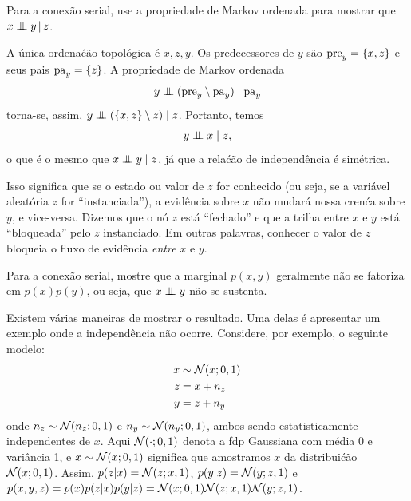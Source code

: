 \begin{exenumerate}
    \item Para a conex\~ao serial, use a propriedade de Markov ordenada para mostrar que 
    $x \mathrel{\perp\mspace{-10mu}\perp} y \,|\, z$.
    \begin{solution}
        A \'unica ordena\'c\~ao topol\'ogica \'e $x, z, y$. Os predecessores de
        $y$ s\~ao $\mathrm{pre}_y = \{x, z\}$ e seus pais $\mathrm{pa}_y = \{z\}$. A
        propriedade de Markov ordenada
        \begin{equation}
            y \mathrel{\perp\mspace{-10mu}\perp} ( \mathrm{pre}_y \setminus \mathrm{pa}_y ) \mid \mathrm{pa}_y
        \end{equation}
        torna-se, assim, $y \mathrel{\perp\mspace{-10mu}\perp} (\{x, z\} \setminus z) \mid z$. Portanto, temos
        \begin{equation}
            y \mathrel{\perp\mspace{-10mu}\perp} x \mid z,
        \end{equation}
        o que \'e o mesmo que $x \mathrel{\perp\mspace{-10mu}\perp} y \mid z$, j\'a que a
        rela\'c\~ao de independ\^encia \'e sim\'etrica.
        
        Isso significa que se o estado ou valor de $z$ for conhecido (ou seja, se
        a vari\'avel aleat\'oria $z$ for ``instanciada''), a evid\^encia sobre $x$
        n\~ao mudar\'a nossa cren\'ca sobre $y$, e vice-versa. Dizemos que
        o n\'o $z$ est\'a ``fechado'' e que a trilha entre $x$ e $y$
        est\'a ``bloqueada'' pelo $z$ instanciado. Em outras palavras, conhecer
        o valor de $z$ bloqueia o fluxo de evid\^encia \emph{entre} $x$
        e $y$.
        
    \end{solution}
    \item Para a conex\~ao serial, mostre que a marginal $p(x,y)$ geralmente n\~ao se fatoriza em $p(x)p(y)$, ou seja, que $x \mathrel{\perp\mspace{-10mu}\perp} y$ n\~ao se sustenta.
    \begin{solution}
        Existem v\'arias maneiras de mostrar o resultado. Uma delas \'e
        apresentar um exemplo onde a independ\^encia n\~ao
        ocorre. Considere, por exemplo, o seguinte modelo:
        \begin{align}
            x & \sim \mathcal{N}(x; 0, 1)\label{eq:serial-x}\\
            z &= x + n_z\\
            y &= z + n_y \label{eq:serial-y}
        \end{align}
        onde $n_z \sim \mathcal{N}(n_z; 0, 1)$ e $n_y \sim \mathcal{N}(n_y;
        0, 1)$, ambos sendo estatisticamente independentes de $x$. Aqui
        $\mathcal{N}(\cdot; 0, 1)$ denota a fdp Gaussiana com m\'edia 0 e
        vari\^ancia 1, e $x \sim \mathcal{N}(x; 0, 1)$ significa que amostramos
        $x$ da distribui\'c\~ao $\mathcal{N}(x; 0, 1)$. Assim, $p(z|x) =
        \mathcal{N}(z; x, 1)$, $p(y|z) = \mathcal{N}(y; z, 1)$ e $p(x, y,z) =
        p(x) p(z|x) p(y|z) = \mathcal{N}(x; 0, 1) \mathcal{N}(z; x,
        1)\mathcal{N}(y; z, 1)$.
        

\end{solution}
\end{exenumerate}
